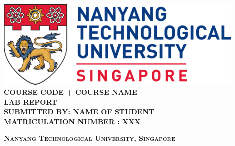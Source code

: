 \begin{titlepage}
\begin{center}

\includegraphics[width=0.9\textwidth]{image/ntu_logo.png}
\\[5cm]

\uppercase{\textbf{\Large{
Course Code + Course Name \\
Lab Report}}}
\\[2cm]

\uppercase{
\textbf{
Submitted by: Name of Student
}
\\
\textbf{
Matriculation Number : XXX\\
}}

\vfill

\textsc{\bfseries Nanyang Technological University, Singapore}


\end{center}
\end{titlepage}
